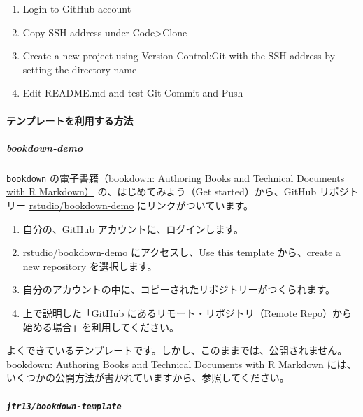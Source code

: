 \documentclass[
]{bxjsbook}
\providecommand{\tightlist}{%
  \setlength{\itemsep}{0pt}\setlength{\parskip}{0pt}}
\theoremstyle{definition}
\theoremstyle{definition}
\theoremstyle{definition}
\theoremstyle{definition}
\theoremstyle{remark}
\begin{document}
\begin{enumerate}
\def\labelenumi{\arabic{enumi}.}
\tightlist
\item
  Login to GitHub account
\item
  Copy SSH address under Code\textgreater Clone
\item
  Create a new project using Version Control:Git with the SSH address by setting the directory name
\item
  Edit README.md and test Git Commit and Push
\end{enumerate}

\hypertarget{ux30c6ux30f3ux30d7ux30ecux30fcux30c8ux3092ux5229ux7528ux3059ux308bux65b9ux6cd5}{%
\paragraph{テンプレートを利用する方法}\label{ux30c6ux30f3ux30d7ux30ecux30fcux30c8ux3092ux5229ux7528ux3059ux308bux65b9ux6cd5}}

\hypertarget{bookdown-demo}{%
\subparagraph{bookdown-demo}\label{bookdown-demo}}

\href{https://bookdown.org/yihui/bookdown/}{\texttt{bookdown} の電子書籍（bookdown: Authoring Books and Technical Documents with R Markdown）} の、はじめてみよう（Get started）から、GitHub リポジトリー \href{https://github.com/rstudio/bookdown-demo}{rstudio/bookdown-demo} にリンクがついています。

\begin{enumerate}
\def\labelenumi{\arabic{enumi}.}
\tightlist
\item
  自分の、GitHub アカウントに、ログインします。
\item
  \href{https://github.com/rstudio/bookdown-demo}{rstudio/bookdown-demo} にアクセスし、Use this template から、create a new repository を選択します。
\item
  自分のアカウントの中に、コピーされたリポジトリーがつくられます。
\item
  上で説明した「GitHub にあるリモート・リポジトリ（Remote Repo）から始める場合」を利用してください。
\end{enumerate}

よくできているテンプレートです。しかし、このままでは、公開されません。\href{https://bookdown.org/yihui/bookdown/}{bookdown: Authoring Books and Technical Documents with R Markdown} には、いくつかの公開方法が書かれていますから、参照してください。

\hypertarget{jtr13bookdown-template}{%
\subparagraph{\texorpdfstring{\texttt{jtr13/bookdown-template}}{jtr13/bookdown-template}}\label{jtr13bookdown-template}}
\end{document}

